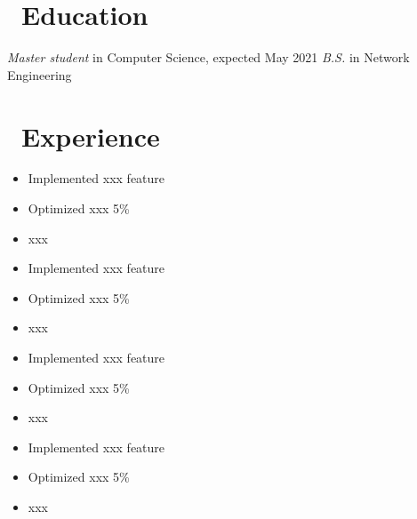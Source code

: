 \documentclass{resume}
\begin{document}



\section{\faGraduationCap\ Education}
\textit{Master student} in Computer Science, expected May 2021
\textit{B.S.} in Network Engineering

\section{\faUsers\ Experience}
\begin{itemize}
  \item Implemented xxx feature
  \item Optimized xxx 5\%
  \item xxx
\end{itemize}

\begin{itemize}
  \item Implemented xxx feature
  \item Optimized xxx 5\%
  \item xxx
\end{itemize}

\begin{itemize}
  \item Implemented xxx feature
  \item Optimized xxx 5\%
  \item xxx
\end{itemize}

\begin{itemize}
  \item Implemented xxx feature
  \item Optimized xxx 5\%
  \item xxx
\end{itemize}
\end{document}
